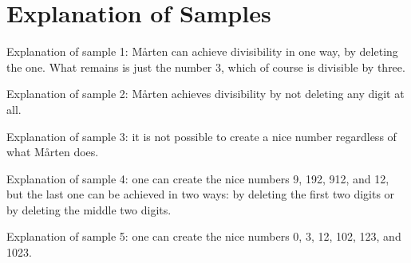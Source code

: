 \section*{Explanation of Samples}
Explanation of sample 1: Mårten can achieve divisibility in one way, by deleting the one. What remains is just the number 3, which of course is divisible by three.

Explanation of sample 2: Mårten achieves divisibility by not deleting any digit at all.

Explanation of sample 3: it is not possible to create a nice number regardless of what Mårten does.

Explanation of sample 4: one can create the nice numbers 9, 192, 912, and 12, but the last one can be achieved in two ways: by deleting the first two digits or by deleting the middle two digits.

Explanation of sample 5: one can create the nice numbers 0, 3, 12, 102, 123, and 1023.
